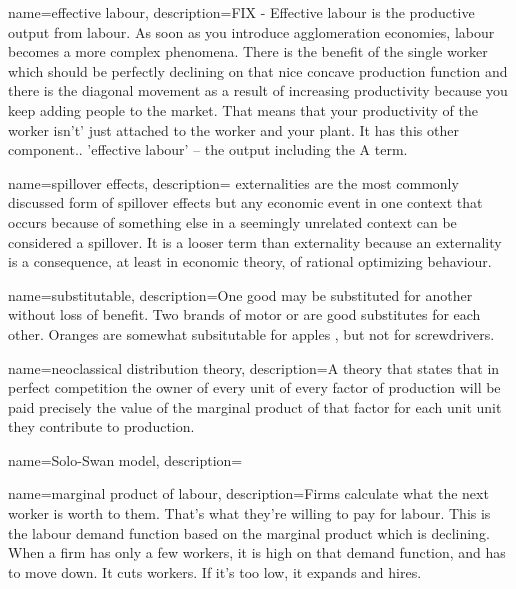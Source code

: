 {
name=effective labour,
description={FIX - Effective labour is the productive output from labour. As soon as you introduce agglomeration economies, labour becomes a more complex phenomena. There is the benefit of the single worker which should be perfectly declining on that nice concave production function and there is the diagonal movement as a result of increasing productivity because you keep adding people to the market. That means that your productivity of the worker isn't' just attached to the worker and your plant. It has this other component.. 'effective labour' -- the output including the A term.}
}

{
name=spillover effects,
description={ \Gls{externalities} are the most commonly discussed form of spillover effects but any economic event in one context that occurs because of something else in a seemingly unrelated context can be considered a spillover. It is a looser term than externality because an externality is a consequence, at least in economic theory, of rational optimizing behaviour.}
}

{
name=substitutable,
description={One good may be substituted for another without loss of benefit. Two brands of motor or are good substitutes for each other. Oranges are somewhat subsitutable for apples , but not for screwdrivers.}
}

{
name=neoclassical distribution theory,
description={A theory that states that in perfect competition the owner of every unit of every  factor of production will be paid precisely the  value of the \gls{marginal product} of that factor for each unit unit they contribute to production. }
}

{
name=Solo-Swan model,
description={}
}

{
name=marginal product of labour,
description={Firms calculate what the next worker is worth to them. That's what they're willing to pay for labour. 
This is the labour demand function based on the \gls{marginal product} which is declining. When a firm has only a few workers, it is high on that demand function, and has to move down. It cuts workers. If it's too low, it expands and hires. %
}
}

